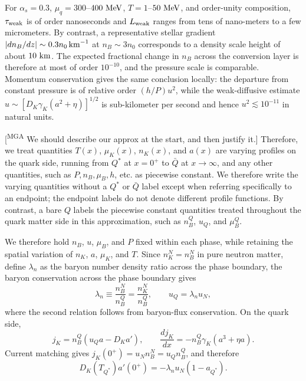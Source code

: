 \documentclass[10pt,superscriptaddress,
amsmath,aps,prc,twocolumn,nofootinbib,floatfix]{revtex4-1}
\newcommand{\mgacom}[1]{\textsf{\color[rgb]{0.7,0,0}[\textsuperscript{MGA} #1]}}
\newcommand{\Qstar}{\ensuremath{Q^*}}
\newcommand{\Qbar}{{\ensuremath{\bar Q}}}
\newcommand{\Bratio}{\lambda_n}
\begin{document}
For $\alpha_s=0.3$, $\mu_q=300$--$400~{\rm MeV}$,
$T=1$--$50~{\rm MeV}$, and order-unity composition,
$\tau_{\rm weak}$ is of order nanoseconds and $L_{\rm weak}$ ranges from tens of nano-meters to a few micrometers.  
By contrast, a representative stellar gradient $\lvert dn_B/dz\rvert\sim0.3n_0\,{\rm km}^{-1}$ at $n_B\sim3n_0$ corresponds to a density scale height of about $10~{\rm km}$.  
The expected fractional change in $n_B$ across the conversion layer is therefore at most of order $10^{-10}$, and the pressure scale is comparable.  Momentum conservation gives the same conclusion locally: the departure from constant pressure is of relative order $(h/P)u^2$, while the weak-diffusive estimate $u\sim[D_K\gamma_K(a^2+\eta)]^{1/2}$ is sub-kilometer per second and hence $u^2\lesssim10^{-11}$ in natural units.

\mgacom{We should describe our approx at the start, and then justify it.}
Therefore, we treat quantities $T(x)$, $\mu_K(x)$, $n_K(x)$, and $a(x)$ are varying profiles on the quark side, running from $\Qstar$ at $x=0^+$ to $\Qbar$ at $x\to\infty$, and any other quantities, such as $P, n_B, \mu_B, h$, etc. as piecewise constant.
We therefore write the varying quantities without a $\Qstar$ or $\Qbar$ label except when referring specifically to an endpoint; the endpoint labels do not denote different profile functions.  
By contrast, a bare $Q$ labels the piecewise constant quantities treated throughout the quark matter side in this approximation, such as $n_B^Q$, $u_Q$, and $\mu_B^Q$.

We therefore hold $n_B$, $u$, $\mu_B$, and $P$ fixed within each phase, while retaining the spatial variation of $n_K$, $a$, $\mu_K$, and $T$.  
Since $n_K^N=n_B^N$ in pure neutron matter, define $\Bratio$ as the baryon number density ratio across the phase boundary, the baryon conservation across the phase boundary gives
\begin{equation}
 \Bratio \equiv\frac{n_B^N}{n_B^Q}
 =\frac{n_K^N}{n_B^Q},
 \qquad
 u_Q=\Bratio u_N,
\label{eq:hydro_piecewise_flux}
\end{equation}
where the second relation follows from baryon-flux conservation.  
On the quark side,
\begin{equation}
 j_K=n_B^Q\left(u_Qa-D_Ka'\right),
 \qquad
 \frac{dj_K}{dx}
 =-n_B^Q\gamma_K\left(a^3+\eta a\right).
\label{eq:hydro_piecewise_transport}
\end{equation}
Current matching gives $j_K(0^+)=u_Nn_B^N=u_Qn_B^Q$, and therefore
\begin{equation}
 D_K(T_{\Qstar})a'(0^+)
 =-\Bratio u_N(1-a_{\Qstar}).
\label{eq:hydro_interface_gradient}
\end{equation}
\end{document}
